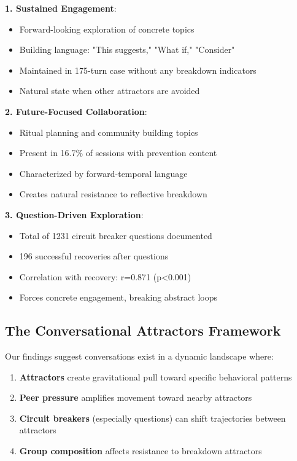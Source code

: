 \documentclass[11pt,letterpaper]{article}
\newcommand{\exponedataQuestionCorrelation}{0.871}
\newcommand{\exponedataQuestionPValue}{p<0.001}
\newcommand{\exponedataNegativeCase}{175}
\newcommand{\exponedataTotalQuestions}{1231}
\newcommand{\exponedataTotalRecoveries}{196}
\newcommand{\exponedataPreventionContentPercentage}{16.7\%}
\begin{document}
\textbf{1. Sustained Engagement}:
\begin{itemize}
    \item Forward-looking exploration of concrete topics
    \item Building language: "This suggests," "What if," "Consider"
    \item Maintained in \exponedataNegativeCase{}-turn case without any breakdown indicators
    \item Natural state when other attractors are avoided
\end{itemize}

\textbf{2. Future-Focused Collaboration}:
\begin{itemize}
    \item Ritual planning and community building topics
    \item Present in \exponedataPreventionContentPercentage{} of sessions with prevention content
    \item Characterized by forward-temporal language
    \item Creates natural resistance to reflective breakdown
\end{itemize}

\textbf{3. Question-Driven Exploration}:
\begin{itemize}
    \item Total of \exponedataTotalQuestions{} circuit breaker questions documented
    \item \exponedataTotalRecoveries{} successful recoveries after questions
    \item Correlation with recovery: r=\exponedataQuestionCorrelation{} (\exponedataQuestionPValue{})
    \item Forces concrete engagement, breaking abstract loops
\end{itemize}

\subsection{The Conversational Attractors Framework}

Our findings suggest conversations exist in a dynamic landscape where:

\begin{enumerate}
    \item \textbf{Attractors} create gravitational pull toward specific behavioral patterns
    \item \textbf{Peer pressure} amplifies movement toward nearby attractors
    \item \textbf{Circuit breakers} (especially questions) can shift trajectories between attractors
    \item \textbf{Group composition} affects resistance to breakdown attractors
\end{enumerate}
\end{document}
